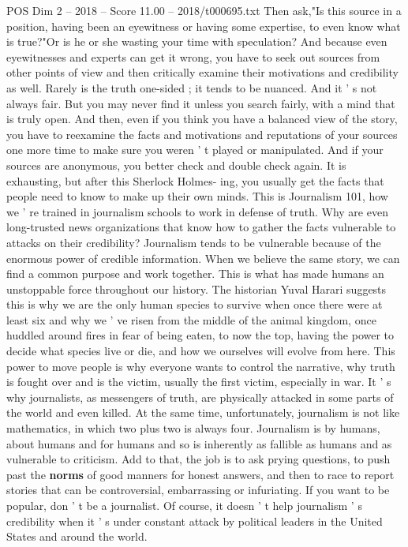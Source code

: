 \begin{textsample}{POS Dim 2 – 2018 – Score 11.00 – 2018/t000695.txt}
Then ask,"Is this source in a position, having been an eyewitness or having some expertise, to even know what is true?"Or is he or she wasting your time with speculation?
And because even eyewitnesses and experts can get it wrong, you have to seek out sources from other points of view and then critically examine their motivations and credibility as well.
Rarely is the truth one-sided ; it tends to be nuanced.
And it ' s not always fair.
But you may never find it unless you search fairly, with a mind that is truly open.
And then, even if you think you have a balanced view of the story, you have to reexamine the facts and motivations and reputations of your sources one more time to make sure you weren ' t played or manipulated.
And if your sources are anonymous, you better check and double check again.
It is exhausting, but after this Sherlock Holmes- ing, you usually get the facts that people need to know to make up their own minds.
This is Journalism 101, how we ' re trained in journalism schools to work in defense of truth.
Why are even long-trusted news organizations that know how to gather the facts vulnerable to attacks on their credibility?
Journalism tends to be vulnerable because of the enormous power of credible information.
When we believe the same story, we can find a common purpose and work together.
This is what has made humans an unstoppable force throughout our history.
The historian Yuval Harari suggests this is why we are the only human species to survive when once there were at least six and why we ' ve risen from the middle of the animal kingdom, once huddled around fires in fear of being eaten, to now the top, having the power to decide what species live or die, and how we ourselves will evolve from here.
This power to move people is why everyone wants to control the narrative, why truth is fought over and is the victim, usually the first victim, especially in war.
It ' s why journalists, as messengers of truth, are physically attacked in some parts of the world and even killed.
At the same time, unfortunately, journalism is not like mathematics, in which two plus two is always four.
Journalism is by humans, about humans and for humans and so is inherently as fallible as humans and as vulnerable to criticism.
Add to that, the job is to ask prying questions, to push past the \textbf{norms} of good manners for honest answers, and then to race to report stories that can be controversial, embarrassing or infuriating.
If you want to be popular, don ' t be a journalist.
Of course, it doesn ' t help journalism ' s credibility when it ' s under constant attack by political leaders in the United States and around the world.

\end{textsample}
